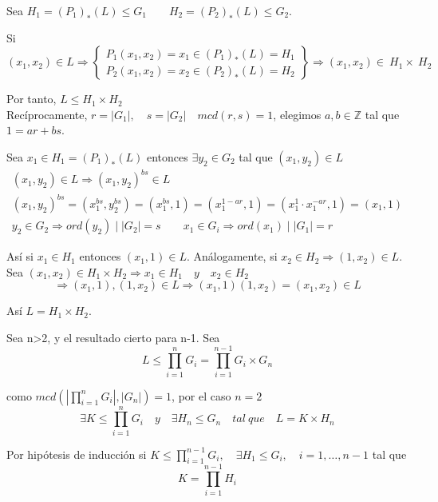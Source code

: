 \documentclass{article}
\begin{document}
Sea $H_1=(P_1)_*(L)\leq G_1 \qquad H_2=(P_2)_*(L)\leq G_2$.

Si $(x_1,x_2)\in L\Rightarrow \left\lbrace \begin{array}{c}
P_1(x_1,x_2)=x_1\in (P_1)_*(L)=H_1\\
P_2(x_1,x_2)=x_2\in (P_2)_*(L)=H_2
\end{array} \right\rbrace \Rightarrow (x_1,x_2)\in~H_1\times~H_2$ 

Por tanto, $L\leq H_1\times H_2$ \\

Recíprocamente, $r=|G_1|,\quad s=|G_2| \quad mcd(r,s)=1$, elegimos $a,b\in \mathbb{Z}$ tal que $1=ar+bs$.

Sea $x_1\in H_1=(P_1)_*(L)$ entonces $\exists y_2\in G_2$ tal que $(x_1,y_2)\in L$
\begin{gather*}
(x_1,y_2)\in L\Rightarrow (x_1,y_2)^{bs}\in L \\
(x_1,y_2)^{bs}=(x_1^{bs},y_2^{bs})=(x_1^{bs},1)=(x_1^{1-ar},1)=(x_1^1\cdot x_1^{-ar},1)=(x_1,1)\\
y_2\in G_2\Rightarrow ord(y_2)\mid |G_2|=s \qquad x_1\in G_i \Rightarrow ord(x_1)\mid |G_1|=r
\end{gather*}

Así si $x_1\in H_1$ entonces $(x_1,1)\in L$. Análogamente, si $x_2\in H_2\Rightarrow (1,x_2)\in L$. \\

Sea $(x_1,x_2)\in H_1\times H_2 \Rightarrow x_1\in H_1 \quad y\quad x_2\in H_2$
\begin{equation*}
\Rightarrow (x_1,1),(1,x_2)\in L\Rightarrow (x_1,1)(1,x_2)=(x_1,x_2)\in L
\end{equation*}

Así $L=H_1\times H_2$.

Sea n>2, y el resultado cierto para n-1. Sea
\begin{equation*}
L\leq \prod_{i=1}^nG_i=\prod_{i=1}^{n-1} G_i\times G_n
\end{equation*}

como $mcd(|\prod_{i=1}^nG_i|,|G_n|)=1$, por el caso $n=2$
\begin{equation*}
\exists K\leq \prod_{i=1}^n G_i \quad y \quad \exists H_n\leq G_n \quad tal\:que\quad L=K\times H_n
\end{equation*}

Por hipótesis de inducción si $K\leq \prod_{i=1}^{n-1}G_i,\quad \exists H_1\leq G_i,\quad i=1,\ldots,n-1$ tal que 
\begin{equation*}
K=\prod_{i=1}^{n-1}H_i
\end{equation*}
\end{document}

